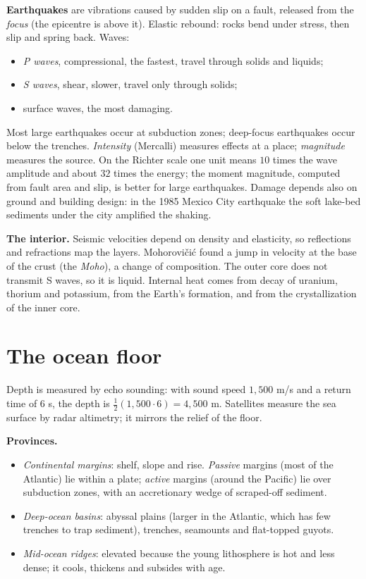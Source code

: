 \textbf{Earthquakes} are vibrations caused
by sudden slip on a fault, released from
the \emph{focus} (the epicentre is above it).
Elastic rebound: rocks bend under stress,
then slip and spring back. Waves:
\begin{itemize}
\item \emph{P waves}, compressional, the
fastest, travel through solids and
liquids;
\item \emph{S waves}, shear, slower, travel
only through solids;
\item surface waves, the most damaging.
\end{itemize}
Most large earthquakes occur at subduction
zones; deep-focus earthquakes occur below
the trenches. \emph{Intensity} (Mercalli)
measures effects at a place;
\emph{magnitude} measures the source. On
the Richter scale one unit means $10$ times
the wave amplitude and about $32$ times the
energy; the moment magnitude, computed from
fault area and slip, is better for large
earthquakes. Damage depends also on ground
and building design: in the 1985 Mexico
City earthquake the soft lake-bed sediments
under the city amplified the shaking.

\textbf{The interior.} Seismic velocities
depend on density and elasticity, so
reflections and refractions map the
layers. Mohorovi\v{c}i\'c found a jump in
velocity at the base of the crust (the
\emph{Moho}), a change of composition. The
outer core does not transmit S waves, so it
is liquid. Internal heat comes from decay
of uranium, thorium and potassium, from
the Earth's formation, and from the
crystallization of the inner core.

\section{The ocean floor}
\label{section-ocean-floor}

Depth is measured by echo sounding: with
sound speed $1{,}500$ m/s and a return time
of $6$ s, the depth is
$\frac12(1{,}500\cdot 6) = 4{,}500$ m.
Satellites measure the sea surface by radar
altimetry; it mirrors the relief of the
floor.

\textbf{Provinces.}
\begin{itemize}
\item \emph{Continental margins}: shelf,
slope and rise. \emph{Passive} margins (most
of the Atlantic) lie within a plate;
\emph{active} margins (around the Pacific)
lie over subduction zones, with an
accretionary wedge of scraped-off sediment.
\item \emph{Deep-ocean basins}: abyssal
plains (larger in the Atlantic, which has
few trenches to trap sediment), trenches,
seamounts and flat-topped guyots.
\item \emph{Mid-ocean ridges}: elevated
because the young lithosphere is hot and
less dense; it cools, thickens and subsides
with age.
\end{itemize}

